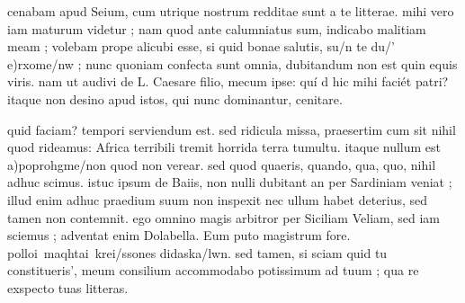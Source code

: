 


 cenabam apud Seium, cum utrique nostrum redditae sunt a te litterae. mihi vero iam maturum videtur ; nam quod ante calumniatus sum, indicabo malitiam meam ; volebam prope alicubi esse, si quid bonae salutis, su/n te du/' e)rxome/nw ; nunc quoniam confecta sunt omnia, dubitandum non est quin equis viris. nam ut audivi de L. Caesare filio, mecum ipse: quí d hic mihi faciét patri? itaque non desino apud istos, qui nunc dominantur, cenitare.

 quid faciam? tempori serviendum est. sed ridicula missa, praesertim cum sit nihil quod rideamus: Africa terribili tremit horrida terra tumultu. itaque nullum est a)poprohgme/non quod non verear. sed quod quaeris, quando, qua, quo, nihil adhuc scimus. istuc ipsum de Baiis, non nulli dubitant an per Sardiniam veniat ; illud enim adhuc praedium suum non inspexit nec ullum habet deterius, sed tamen non contemnit. ego omnino magis arbitror per Siciliam Veliam, sed iam sciemus ; adventat enim Dolabella. Eum puto magistrum fore. polloi\ maqhtai\ krei/ssones didaska/lwn. sed tamen, si sciam quid tu constitueris', meum consilium accommodabo potissimum ad tuum ; qua re exspecto tuas litteras.
